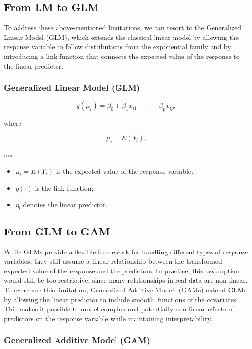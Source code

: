 \subsection{From LM to GLM}
To address these above-mentioned limitations, we can resort to 
the Generalized Linear Model (GLM), which extends the classical
linear model by allowing the response variable to follow 
distributions from the exponential family and by introducing a 
link function that connects the expected value of the response 
to the linear predictor.
\subsubsection{Generalized Linear Model (GLM)}

\begin{equation}
g(\mu_i)=
\beta_0+\beta_1x_{i1}+\cdots+\beta_px_{ip},
\end{equation}

where

\begin{equation}
\mu_i=E(Y_i),
\end{equation}

and:
\begin{itemize}
    \item $\mu_i=E(Y_i)$ is the expected value of the response variable;
    \item $g(\cdot)$ is the link function;
    \item $\eta_i$ denotes the linear predictor.
\end{itemize}

\subsection{From GLM to GAM}
While GLMs provide a flexible framework for handling different
types of response variables, they still assume a linear 
relationship between the transformed expected value of the
response and the predictors. In practice, this assumption would
still be too restrictive, since many relationships in real 
data are non-linear.\\
To overcome this limitation, Generalized Additive Models (GAMs) 
extend GLMs by allowing the linear predictor to include smooth, 
functions of the covariates. This makes it possible to model 
complex and potentially non-linear effects of predictors on the 
response variable while maintaining interpretability.
\subsubsection{Generalized Additive Model (GAM)}

